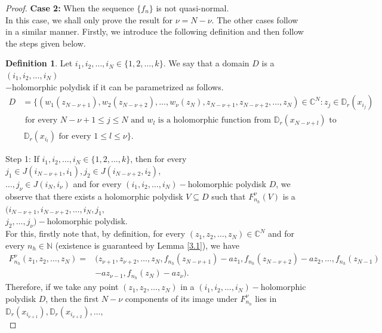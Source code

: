 \documentclass[12pt, reqno]{amsart}
\numberwithin{equation}{section}
\theoremstyle{definition}
\newtheorem{definition}{Definition}[section]
\theoremstyle{remark}
\theoremstyle{plain}
\theoremstyle{definition}
\numberwithin{equation}{section}
\begin{document}
\begin{proof}
\noindent \textbf{Case 2:} When the sequence $\{f_n\}$ is not quasi-normal.\\
 In this case, we shall only prove the result for $\nu=N-\nu.$ The other cases follow in a similar manner.  Firstly, we introduce the following definition and then follow the steps given below.
\begin{definition}
Let $i_1,i_2,\dots, i_N\in\{1, 2, \dots,k\}$. We say that a domain $D$ is a $(i_1,i_2,\dots, i_N)$\\$-$holomorphic polydisk if it can be parametrized as follows.
\begin{align*}
D&=\{(w_{1}(z_{N-\nu+1}),w_2(z_{N-\nu+2}),\dots,w_{\nu}(z_N), z_{N-\nu+1}, z_{N-\nu+2},\dots, z_N)\in\mathbb{C}^N: z_{j}\in\mathbb{D}_r(x_{i_j})\\
& \text{ for every }N-\nu+1\leq j\leq N \text{ and } w_l \text{ is a holomorphic  function from }\mathbb{D}_r(x_{N-\nu+l}) \text{ to }\\
& \,\mathbb{D}_r(x_{i_l}) \text{ for every }1\leq l\leq \nu\}.
\end{align*}
\end{definition}
\noindent Step 1: 
If $i_1, i_2,\dots, i_N\in\{1,2,\dots,k\}$, then for every $j_1\in J(i_{N-\nu+1}, i_1), j_2\in J(i_{N-\nu+2}, i_2),$\\
$\dots,j_{\nu}\in J(i_{N}, i_{\nu})$ and for every $(i_1, i_2,\dots, i_N)-$holomorphic polydisk $D$, we observe that there exists a holomorphic polydisk $V\subseteq D$ such that $F_{n_h}^{\nu}(V)$ is a $(i_{N-\nu+1}, i_{N-\nu+2},\dots,i_N, j_1, $\\
$j_2,\dots, j_{\nu})-$holomorphic polydisk.\\
\vspace{0.2cm}
For this, firstly note that, by definition, for every $(z_1,z_2,\dots, z_{N})\in\mathbb{C}^N$ and for every $n_h\in\mathbb{N}$ (existence is guaranteed by Lemma \ref{3.1}), we have 
\\
\begin{align*}
F^{\nu}_{n_h}(z_1, z_2,\dots, z_N)=&(z_{\nu+1}, z_{\nu+2}, \dots, z_N, f_{n_h}(z_{N-\nu+1})-az_1, f_{n_h}(z_{N-\nu+2})-az_2,\dots, f_{n_h}(z_{N-1})\\
&-az_{\nu-1}, f_{n_h}(z_{N})-az_{\nu}).
\end{align*}
Therefore, if we take any point $(z_1, z_2,\dots,z_N)$ in a  $(i_1, i_2,\dots, i_N)-$holomorphic polydisk $D$, then the first $N-\nu$ components of its image under $F^{\nu}_{n_h}$ lies in $\mathbb{D}_r(x_{i_{\nu+1}}), \mathbb{D}_r(x_{i_{\nu+2}}), \dots,$\\

\end{proof}
\end{document}
